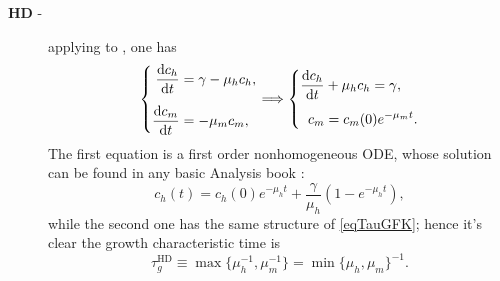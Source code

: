 \documentclass{article}
\begin{document}
\begin{description}
                    \item[\textbf{HD} - ] applying  to \HDcontinuous{}, one has
                    \begin{equation*}
                        \left\{
                        \begin{aligned}
                            \derT{c_h}t&=\gamma-\mu_hc_h,\\[5pt]
                            \derT{c_m}t&=-\mu_mc_m,
                        \end{aligned}
                        \right.
                        \implies
                        \left\{
                        \begin{aligned}
                            \derT{c_h}t&+\mu_hc_h=\gamma,\\[5pt]
                            c_m&=c_m(0)e^{-\mu_mt}.
                        \end{aligned}
                        \right.
                    \end{equation*}
                    The first equation is a first order nonhomogeneous ODE, whose solution can be found in any basic Analysis book \cite{AnalisiICanutoTabacco2014}:
                    \begin{equation}
                        c_h(t)=c_h(0)e^{-\mu_ht}+\frac{\gamma}{\mu_h}\left(1-e^{-\mu_ht}\right),
                        \label{eqFirstNonhomogeneousODESolution}
                    \end{equation}
                    while the second one has the same structure of \eqref{eqTauGFK}; hence it's clear the growth characteristic time is
                    \begin{equation}
                        \tau_g^{\text{HD}}\equiv
                        \max\{\mu_h^{-1},\mu_m^{-1}\}=
                        \min\{\mu_h,\mu_m\}^{-1}.
                        \label{eqTauGHD}
                    \end{equation}


\end{description}
\end{document}

